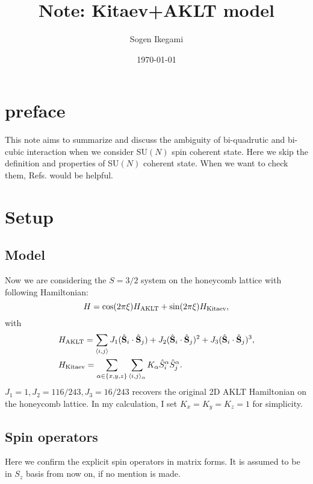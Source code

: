 \documentclass[11pt, aps, longbibliography]{article}
\begin{document}
\title{Note: Kitaev+AKLT model}
\author{Sogen Ikegami}
\date{\today}
\maketitle

\tableofcontents

\section*{preface}

This note aims to summarize and discuss the ambiguity of bi-quadrutic and bi-cubic interaction when we consider SU$(N)$ spin coherent state.
Here we skip the definition and properties of SU$(N)$ coherent state. When we want to check them, Refs. \cite{Nemoto_2000,PhysRevB.108.L241108} would be helpful.

\newpage
\section{Setup}
    \subsection{Model}
        Now we are considering the $S=3/2$ system on the honeycomb lattice with following Hamiltonian:
        \begin{equation}\label{eq:Hamiltonian}
            H = \cos (2\pi \xi) H_{\rm AKLT} + \sin (2\pi \xi) H_{\rm Kitaev},
        \end{equation}
        with
        \begin{align}
            &H_{\rm AKLT} = \sum_{\langle i,j \rangle}J_1(\hat{\bold{S}}_{i}\cdot \hat{\bold{S}}_{j}) + J_2(\hat{\bold{S}}_{i}\cdot \hat{\bold{S}}_{j})^2 + J_3(\hat{\bold{S}}_{i}\cdot \hat{\bold{S}}_{j})^3, \\
            &H_{\rm Kitaev} = \sum_{\alpha \in \{x,y,z\}}\sum_{\langle i,j \rangle_\alpha} K_{\alpha}\hat{S}_{i}^{\alpha}\hat{S}_{j}^{\alpha}.
        \end{align}
        $J_1=1, J_2=116/243, J_3=16/243$ recovers the original 2D AKLT Hamiltonian on the honeycomb lattice. In my calculation, I set $K_x=K_y=K_z=1$ for simplicity.

    \subsection{Spin operators}
        Here we confirm the explicit spin operators in matrix forms. It is assumed to be in $S_z$ basis from now on, if no mention is made.
\end{document}
